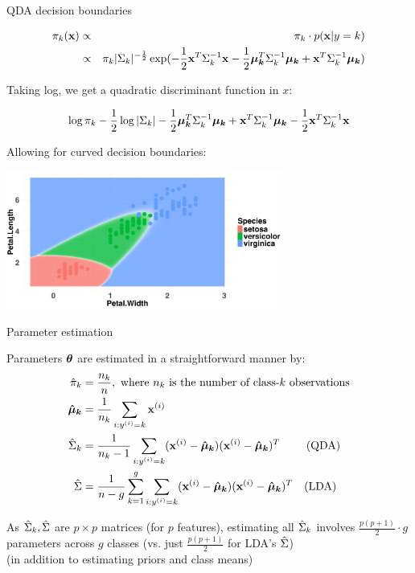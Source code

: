 \documentclass[11pt,compress,t,notes=noshow, xcolor=table]{beamer}
\begin{document}
\begin{vbframe}{QDA decision boundaries}

\vspace{-2em}
\begin{small}
\begin{eqnarray*}
\pi_{k}(\mathbf{x}) &\propto& \pi_{k} \cdot p(\mathbf{x} | y= k) \\
&\propto& \pi_{k} |\Sigma_k|^{-\frac{1}{2}}\exp(- \frac{1}{2} \mathbf{x}^T\Sigma_k^{-1}\mathbf{x} - \frac{1}{2} \bm{\mu_{k}}^T \Sigma_k^{-1} \bm{\mu_{k}} + \mathbf{x}^T \Sigma_k^{-1} \bm{\mu_{k}} )
\end{eqnarray*}

Taking log, we get a quadratic discriminant function in $x$:

$$ \log \pi_{k} - \frac{1}{2} \log |\Sigma_k| - \frac{1}{2} \bm{\mu_{k}}^T \Sigma_k^{-1} \bm{\mu_{k}} + \mathbf{x}^T \Sigma_k^{-1} \bm{\mu_{k}} - \frac{1}{2} \mathbf{x}^T\Sigma_k^{-1}\mathbf{x} $$


Allowing for curved decision boundaries:

\vspace{-0.5em}
\begin{center}
\includegraphics[width=0.68\textwidth, clip=true, trim={0 0 0 20}]{figure/disc_db-qda.png}
\end{center}
\end{small}

\end{vbframe}

\begin{vbframe}{Parameter estimation}

Parameters $\bm{\theta}$ are estimated in a straightforward manner by:\\
\begin{equation*}
\begin{aligned}
\hat{\pi}_{k} &= \frac{n_k}{n},\text{ where $n_k$ is the number of class-$k$ observations} \\
\bm{\hat{\mu}_{k}} &= \frac{1}{n_k}\sum_{i:y^{(i)} = k} \mathbf{x}^{(i)} \\
\hat \Sigma_k &= \frac{1}{n_k - 1} \sum_{i: y^{(i)} = k} (\mathbf{x}^{(i)} - \bm{\hat{\mu}_{k}}) (\mathbf{x}^{(i)} - \bm{\hat{\mu}_{k}})^T \quad \quad \text{   (QDA)} \\
\hat \Sigma &= \frac{1}{n - g} \sum\limits_{k=1}^g \sum_{i: y^{(i)} = k} (\mathbf{x}^{(i)} - \bm{\hat{\mu}_{k}}) (\mathbf{x}^{(i)} - \bm{\hat{\mu}_{k}})^T \quad \text{(LDA)} \\
\end{aligned}
\end{equation*}

\lz

As $\hat \Sigma_k, \hat \Sigma$ are $p \times p$ matrices (for $p$ features), estimating all $\hat \Sigma_k$ involves $\frac{p(p+1)}{2} \cdot g$ parameters across $g$ classes (vs. just $\frac{p(p+1)}{2}$ for LDA's $\hat \Sigma$)\\
(in addition to estimating priors and class means)
\end{vbframe}
\end{document}
